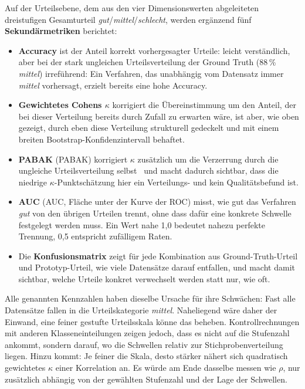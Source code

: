 Auf der Urteilsebene, dem aus den vier Dimensionswerten abgeleiteten dreistufigen
Gesamturteil \emph{gut}/\emph{mittel}/\emph{schlecht}, werden ergänzend fünf
\textbf{Sekundärmetriken} berichtet:

\begin{itemize}
    \item \textbf{Accuracy} ist der Anteil korrekt vorhergesagter Urteile: leicht
    verständlich, aber bei der stark ungleichen Urteilsverteilung der Ground Truth
    (88\,\% \emph{mittel}) irreführend: Ein Verfahren, das unabhängig vom Datensatz
    immer \emph{mittel} vorhersagt, erzielt bereits eine hohe Accuracy.
    \item \textbf{Gewichtetes Cohens $\kappa$} korrigiert die Übereinstimmung um den
    Anteil, der bei dieser Verteilung bereits durch Zufall zu erwarten wäre, ist aber,
    wie oben gezeigt, durch eben diese Verteilung strukturell gedeckelt und mit einem
    breiten Bootstrap-Konfidenzintervall behaftet.
    \item \textbf{PABAK} (\acrlong{PABAK}) korrigiert $\kappa$
    zusätzlich um die Verzerrung durch die ungleiche Urteilsverteilung
    selbst~\cite{byrt1993bias} und macht dadurch sichtbar, dass die niedrige
    $\kappa$-Punktschätzung hier ein Verteilungs- und kein Qualitätsbefund ist.
    \item \textbf{AUC} (\acrlong{AUC}, Fläche unter der Kurve der \acrfull{ROC}) misst, wie gut das Verfahren
    \emph{gut} von den übrigen Urteilen trennt, ohne dass dafür eine konkrete Schwelle
    festgelegt werden muss. Ein Wert nahe 1,0 bedeutet nahezu perfekte Trennung, 0,5
    entspricht zufälligem Raten.
    \item Die \textbf{Konfusionsmatrix} zeigt für jede Kombination aus
    Ground-Truth-Urteil und Prototyp-Urteil, wie viele Datensätze darauf entfallen, und
    macht damit sichtbar, welche Urteile konkret verwechselt werden statt nur, wie oft.
\end{itemize}

Alle genannten Kennzahlen haben dieselbe Ursache für ihre Schwächen: Fast alle
Datensätze fallen in die Urteilskategorie \emph{mittel}. Naheliegend wäre daher der Einwand,
eine feiner gestufte Urteilsskala könne das beheben.
Kontrollrechnungen mit anderen Klasseneinteilungen zeigen jedoch, dass es nicht auf die
Stufenzahl ankommt, sondern darauf, wo die Schwellen relativ zur Stichprobenverteilung
liegen. Hinzu kommt: Je feiner die Skala, desto stärker nähert sich quadratisch
gewichtetes $\kappa$ einer Korrelation an. Es würde am Ende dasselbe messen wie $\rho$,
nur zusätzlich abhängig von der gewählten Stufenzahl und der Lage der Schwellen.

